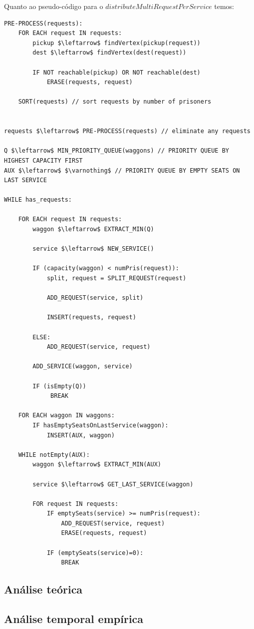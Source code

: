 \documentclass[article, a4paper, 12pt, oneside]{memoir}
\begin{document}
Quanto ao pseudo-código para o $distributeMultiRequestPerService$ temos:\\
\begin{lstlisting}[frame=single, mathescape=true]
PRE-PROCESS(requests):
	FOR EACH request IN requests:
		pickup $\leftarrow$ findVertex(pickup(request))
		dest $\leftarrow$ findVertex(dest(request))
		
		IF NOT reachable(pickup) OR NOT reachable(dest)
			ERASE(requests, request)

	SORT(requests) // sort requests by number of prisoners


requests $\leftarrow$ PRE-PROCESS(requests) // eliminate any requests 

Q $\leftarrow$ MIN_PRIORITY_QUEUE(waggons) // PRIORITY QUEUE BY HIGHEST CAPACITY FIRST
AUX $\leftarrow$ $\varnothing$ // PRIORITY QUEUE BY EMPTY SEATS ON LAST SERVICE

WHILE has_requests:

	FOR EACH request IN requests:
		waggon $\leftarrow$ EXTRACT_MIN(Q)
	
		service $\leftarrow$ NEW_SERVICE()
	
		IF (capacity(waggon) < numPris(request)):
			split, request = SPLIT_REQUEST(request)
		
			ADD_REQUEST(service, split)
		
			INSERT(requests, request)
		
		ELSE:
			ADD_REQUEST(service, request)
		
		ADD_SERVICE(waggon, service)
	
		IF (isEmpty(Q))
			 BREAK
			 
	FOR EACH waggon IN waggons:
		IF hasEmptySeatsOnLastService(waggon):
			INSERT(AUX, waggon)
			
	WHILE notEmpty(AUX):
		waggon $\leftarrow$ EXTRACT_MIN(AUX)
		
		service $\leftarrow$ GET_LAST_SERVICE(waggon)
		
		FOR request IN requests:
			IF emptySeats(service) >= numPris(request):
				ADD_REQUEST(service, request)
				ERASE(requests, request)
		
			IF (emptySeats(service)=0):
				BREAK
\end{lstlisting}

\subsection{Análise teórica}
\subsection{Análise temporal empírica}
\end{document}
